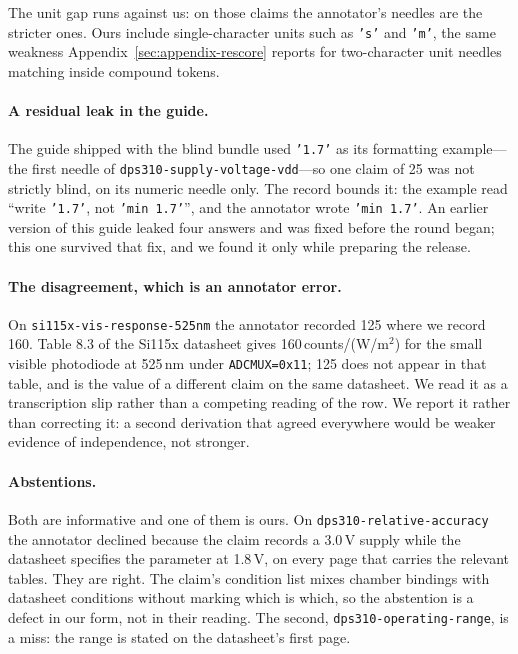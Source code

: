 \documentclass[11pt]{article}
\begin{document}
The unit gap runs against us: on those claims the annotator's needles
are the stricter ones. Ours include
single-character units such as \texttt{'s'} and \texttt{'m'}, the same
weakness Appendix~\ref{sec:appendix-rescore} reports for two-character
unit needles matching inside compound tokens.

\paragraph{A residual leak in the guide.}
The guide shipped with the blind bundle used \texttt{'1.7'} as its
formatting example---the first needle of
\texttt{dps310-supply-voltage-vdd}---so one claim of 25 was not strictly
blind, on its numeric needle only. The record bounds it: the example read
``write \texttt{'1.7'}, not \texttt{'min 1.7'}'', and the annotator wrote
\texttt{'min 1.7'}. An earlier version of this guide leaked four answers
and was fixed before the round began; this one survived that fix, and we
found it only while preparing the release.

\paragraph{The disagreement, which is an annotator error.}
On \texttt{si115x-vis-response-525nm} the annotator recorded 125 where we
record 160. Table 8.3 of the Si115x datasheet gives
160\,counts/(W/m$^2$) for the small visible photodiode at 525\,nm under
\texttt{ADCMUX=0x11}; 125 does not appear in that table, and is the value
of a different claim on the same datasheet. We read it as a
transcription slip rather than a competing reading of the row. We
report it rather than correcting it: a second derivation that agreed
everywhere would be weaker evidence of independence, not stronger.

\paragraph{Abstentions.}
Both are informative and one of them is ours. On
\texttt{dps310-relative-accuracy} the annotator declined because the
claim records a 3.0\,V supply while the datasheet specifies the parameter
at 1.8\,V, on every page that carries the relevant tables. They are
right. The claim's condition list mixes chamber bindings with datasheet
conditions without marking which is which, so the abstention is a
defect in our form, not in their reading. The second, \texttt{dps310-operating-range}, is a miss:
the range is stated on the datasheet's first page.
\end{document}
